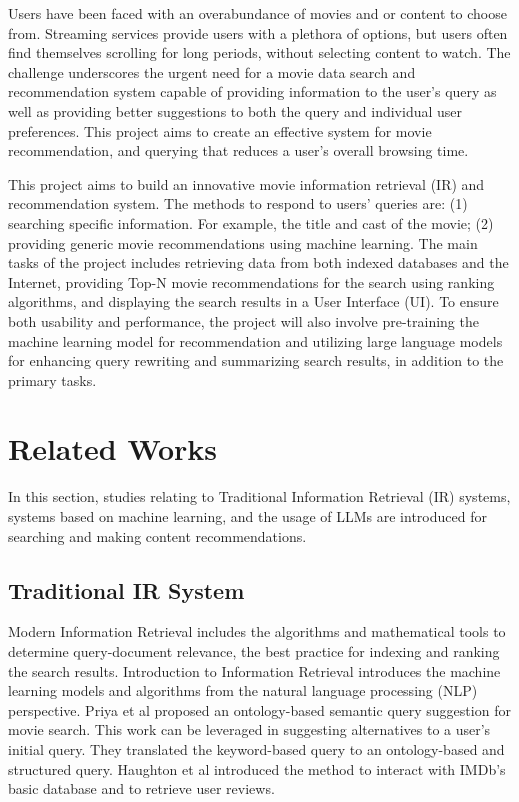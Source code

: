 \documentclass[journal]{IEEEtran}
\begin{document}
Users have been faced with an overabundance of movies and or content to choose from. Streaming services provide users with a plethora of options, but users often find themselves scrolling for long periods, without selecting content to watch. The challenge underscores the urgent need for a movie data search and recommendation system capable of providing information to the user’s query as well as providing better suggestions to both the query and individual user preferences. This project aims to create an effective system for movie recommendation, and querying that reduces a user's overall browsing time.

This project aims to build an innovative movie information retrieval (IR) and recommendation system. The methods to respond to users’ queries are: (1) searching specific information. For example, the title and cast of the movie; (2) providing generic movie recommendations using machine learning. The main tasks of the project includes retrieving data from both indexed databases and the Internet, providing Top-N movie recommendations for the search using ranking algorithms, and displaying the search results in a User Interface (UI). To ensure both usability and performance, the project will also involve pre-training the machine learning model for recommendation and utilizing large language models for enhancing query rewriting and summarizing search results, in addition to the primary tasks. 

\section{Related Works}
In this section, studies relating to Traditional Information Retrieval (IR) systems, systems based on machine learning, and the usage of LLMs are introduced for searching and making content recommendations.

\subsection{Traditional IR System}
Modern Information Retrieval\cite{RN15} includes the algorithms and mathematical tools to determine query-document relevance, the best practice for indexing and ranking the search results. Introduction to Information Retrieval\cite{manning2008introduction} introduces the machine learning models and algorithms from the natural language processing (NLP) perspective. Priya et al\cite{6508326} proposed an ontology-based semantic query suggestion for movie search. This work can be leveraged in suggesting alternatives to a user’s initial query. They translated the keyword-based query to an ontology-based and structured query. Haughton et al\cite{RN16} introduced the method to interact with IMDb’s basic database and to retrieve user reviews. 
\end{document}
